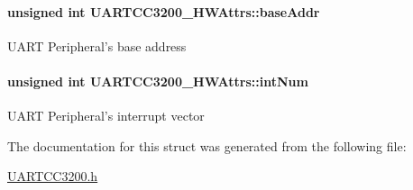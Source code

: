 \paragraph[{base\-Addr}]{\setlength{\rightskip}{0pt plus 5cm}unsigned int U\-A\-R\-T\-C\-C3200\-\_\-\-H\-W\-Attrs\-::base\-Addr}\label{struct_u_a_r_t_c_c3200___h_w_attrs_a559d6e21a7f9950e0d3e9d42413d47ea}
U\-A\-R\-T Peripheral's base address 
\paragraph[{int\-Num}]{\setlength{\rightskip}{0pt plus 5cm}unsigned int U\-A\-R\-T\-C\-C3200\-\_\-\-H\-W\-Attrs\-::int\-Num}\label{struct_u_a_r_t_c_c3200___h_w_attrs_a45e245f429f6bba9b77223bdcd58f2a2}
U\-A\-R\-T Peripheral's interrupt vector 

The documentation for this struct was generated from the following file\-:\begin{DoxyCompactItemize}
\item 
\hyperlink{_u_a_r_t_c_c3200_8h}{U\-A\-R\-T\-C\-C3200.\-h}\end{DoxyCompactItemize}
